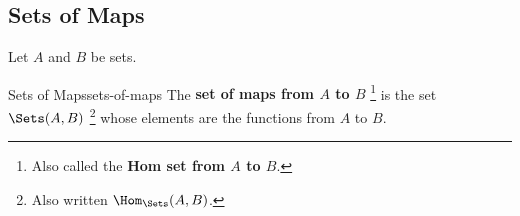 \subsection{Sets of Maps}\label{subsection-sets-of-maps}
Let $A$ and $B$ be sets.
\begin{definition}{Sets of Maps}{sets-of-maps}%
    The \textbf{set of maps from $A$ to $B$}%
    \footnote{%
        Also called the \textbf{Hom set from $A$ to $B$}.
    } %
    is the set $\Sets(A,B)$%
    \footnote{%
        Also written $\Hom_{\Sets}(A,B)$.
        \par\vspace*{\TCBBoxCorrection}
    } %
    whose elements are the functions from $A$ to $B$.
\end{definition}
